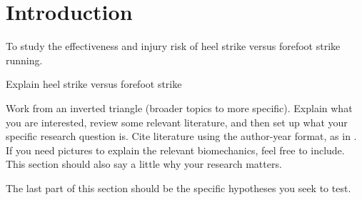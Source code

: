 \section{Introduction}

To study the effectiveness and injury risk of heel strike versus forefoot strike running.

Explain heel strike versus forefoot strike

Work from an inverted triangle (broader topics to more specific). Explain what you are interested, review some relevant literature, and then set up what your specific research question is. Cite literature using the author-year format, as in \citep{buck2020go}. If you need pictures to explain the relevant biomechanics, feel free to include. This section should also say a little why your research matters. 

The last part of this section should be the specific hypotheses you seek to test. 
